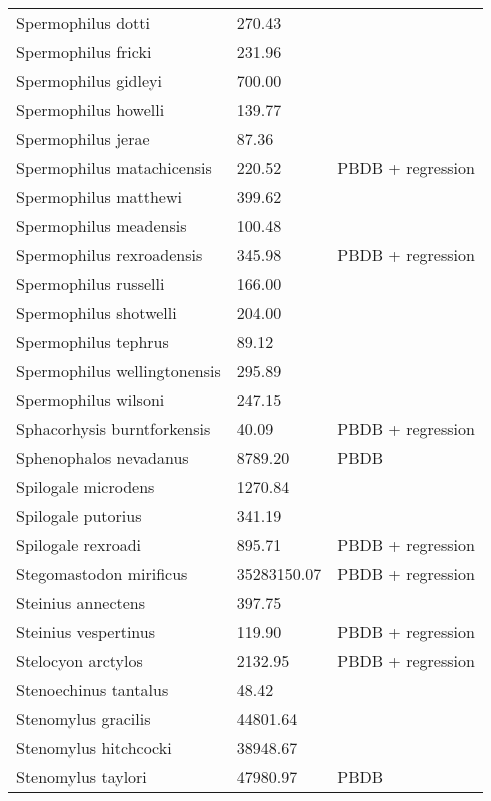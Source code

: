 \documentclass{article}
\begin{document}
\begin{center}
\begin{longtable}{p{} p{} p{}}
    Spermophilus dotti & 270.43 & \cite{Tomiya2013} \\ 
    Spermophilus fricki & 231.96 & \cite{Simons1960} \\ 
    Spermophilus gidleyi & 700.00 & \cite{McKenna2011} \\ 
    Spermophilus howelli & 139.77 & \cite{Tomiya2013} \\ 
    Spermophilus jerae & 87.36 & \cite{Tomiya2013} \\ 
    Spermophilus matachicensis & 220.52 & PBDB + regression \\ 
    Spermophilus matthewi & 399.62 & \cite{Beatty2009} \\ 
    Spermophilus meadensis & 100.48 & \cite{Tomiya2013} \\ 
    Spermophilus rexroadensis & 345.98 & PBDB + regression \\ 
    Spermophilus russelli & 166.00 & \cite{McKenna2011} \\ 
    Spermophilus shotwelli & 204.00 & \cite{McKenna2011} \\ 
    Spermophilus tephrus & 89.12 & \cite{Tomiya2013} \\ 
    Spermophilus wellingtonensis & 295.89 & \cite{Tomiya2013} \\ 
    Spermophilus wilsoni & 247.15 & \cite{Tomiya2013} \\ 
    Sphacorhysis burntforkensis & 40.09 & PBDB + regression \\ 
    Sphenophalos nevadanus & 8789.20 & PBDB \\ 
    Spilogale microdens & 1270.84 & \cite{Chester2012} \\ 
    Spilogale putorius & 341.19 & \cite{Smith2004} \\ 
    Spilogale rexroadi & 895.71 & PBDB + regression \\ 
    Stegomastodon mirificus & 35283150.07 & PBDB + regression \\ 
    Steinius annectens & 397.75 & \cite{Strait2001} \\ 
    Steinius vespertinus & 119.90 & PBDB + regression \\ 
    Stelocyon arctylos & 2132.95 & PBDB + regression \\ 
    Stenoechinus tantalus & 48.42 & \cite{Tomiya2013} \\ 
    Stenomylus gracilis & 44801.64 & \cite{Tomiya2013} \\ 
    Stenomylus hitchcocki & 38948.67 & \cite{Tomiya2013} \\ 
    Stenomylus taylori & 47980.97 & PBDB \\ 

\end{longtable}
\end{center}
\end{document}
